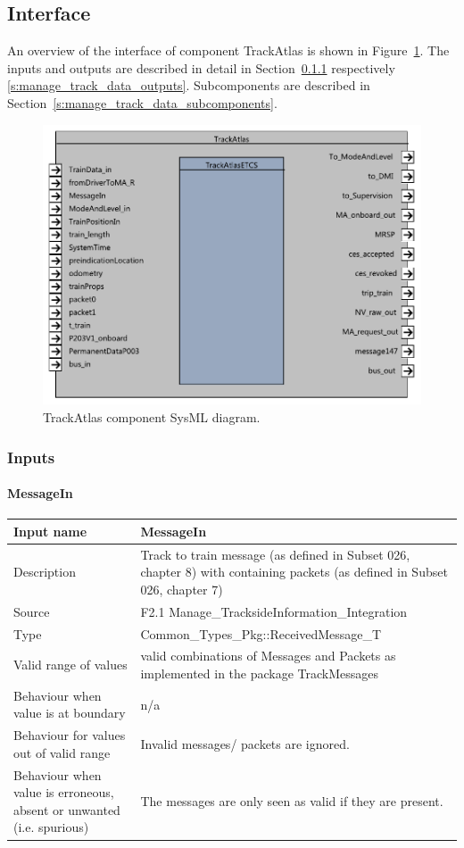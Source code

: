 \subsection{Interface}

An overview of the interface of component TrackAtlas is shown in Figure~\ref{f:manage_track_data_interface}. The inputs and outputs are described in detail in Section~\ref{s:manage_track_data_inputs} respectively \ref{s:manage_track_data_outputs}. Subcomponents are described in Section~\ref{s:manage_track_data_subcomponents}.

\begin{figure}[H]
\center
\includegraphics[width=.8\textwidth]{images/F2_4_TrackAtlas.pdf}
\caption{TrackAtlas component SysML diagram.}\label{f:manage_track_data_interface}
\end{figure}


\subsubsection{Inputs}\label{s:manage_track_data_inputs}

\paragraph{MessageIn}

\begin{longtable}{p{}p{}}
\toprule
Input name				& MessageIn \\
\midrule
Description				& Track to train message (as defined in Subset 026, chapter 8) with containing packets (as defined in Subset 026, chapter 7) \\
\midrule
Source					& F2.1 Manage\_TracksideInformation\_Integration\\ 
\midrule
Type					& Common\_Types\_Pkg::ReceivedMessage\_T \\
\midrule
Valid range of values	& valid combinations of Messages and Packets as implemented in the package TrackMessages \\
\midrule
Behaviour when value is at boundary	& n/a\\
\midrule
Behaviour for values out of valid range	& Invalid messages/ packets are ignored. \\
\midrule
Behaviour when value is erroneous, absent or unwanted (i.e. spurious) & The messages are only seen as valid if they are present. \\
\bottomrule
\end{longtable}


